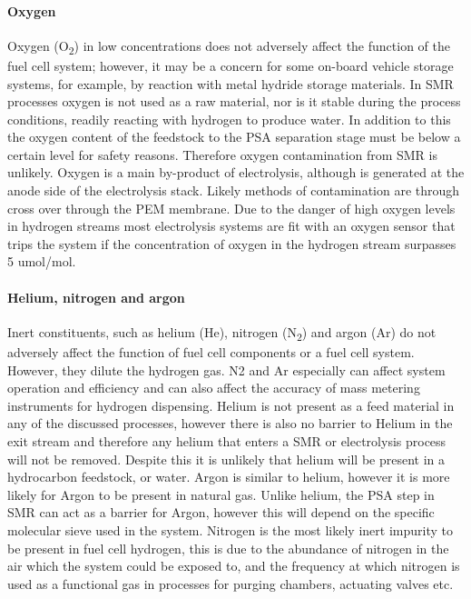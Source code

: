 \paragraph{Oxygen}
Oxygen (O\textsubscript{2}) in low concentrations does not adversely affect the function of the fuel cell system; however, 
it may be a concern for some on-board vehicle storage systems, for example, by reaction with metal hydride 
storage materials.
In SMR processes oxygen is not used as a raw material, nor is it stable during the process conditions, 
readily reacting with hydrogen to produce water. In addition to this the oxygen content of the feedstock 
to the PSA separation stage must be below a certain level for safety reasons. Therefore oxygen contamination 
from SMR is unlikely. 
Oxygen is a main by-product of electrolysis, although is generated at the anode side of the electrolysis 
stack. Likely methods of contamination are through cross over through the PEM membrane. Due to the danger 
of high oxygen levels in hydrogen streams most electrolysis systems are fit with an oxygen sensor that trips 
the system if the concentration of oxygen in the hydrogen stream surpasses 5 umol/mol. 

\paragraph{Helium, nitrogen and argon}
Inert constituents, such as helium (He), nitrogen (N\textsubscript{2}) and argon (Ar) do not adversely affect the function 
of fuel cell components or a fuel cell system. However, they dilute the hydrogen gas. N2 and Ar especially 
can affect system operation and efficiency and can also affect the accuracy of mass metering instruments for 
hydrogen dispensing.
Helium is not present as a feed material in any of the discussed processes, however there is also no barrier 
to Helium in the exit stream and therefore any helium that enters a SMR or electrolysis process will not be 
removed. Despite this it is unlikely that helium will be present in a hydrocarbon feedstock, or water.
Argon is similar to helium, however it is more likely for Argon to be present in natural gas. Unlike helium, 
the PSA step in SMR can act as a barrier for Argon, however this will depend on the specific molecular sieve 
used in the system.
Nitrogen is the most likely inert impurity to be present in fuel cell hydrogen, this is due to the abundance 
of nitrogen in the air which the system could be exposed to, and the frequency at which nitrogen is used as 
a functional gas in processes for purging chambers, actuating valves etc.

